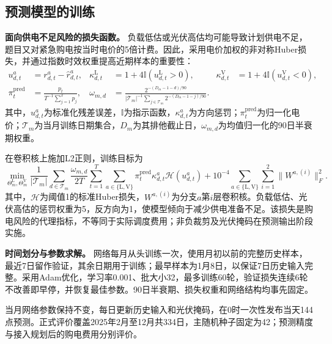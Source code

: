 \documentclass[withoutpreface,bwprint]{cumcmthesis}
\begin{document}
\subsection{预测模型的训练}
\textbf{面向供电不足风险的损失函数。}
负载低估或光伏高估均可能导致计划供电不足，题目又对紧急购电按当时电价的5倍计费。因此，采用电价加权的非对称Huber损失，并通过指数时效权重提高近期样本的重要性：
\begin{equation}\label{eq:q2-weights}
 \begin{aligned}
 u^a_{d,t}&=r^a_{d,t}-\widehat r^a_{d,t},&
 \kappa^{\mathrm L}_{d,t}&=1+4\mathbb I(u^{\mathrm L}_{d,t}>0),&
 \kappa^{\mathrm V}_{d,t}&=1+4\mathbb I(u^{\mathrm V}_{d,t}<0),\\
 \pi_t^{\mathrm{pred}}&=\frac{p_t}{T^{-1}\sum_{j=1}^{T}p_j},&
 \omega_{m,d}&=\frac{2^{-(D_m-1-d)/90}}
 {|\mathcal T_m|^{-1}\sum_{j\in\mathcal T_m}2^{-(D_m-1-j)/90}}.&&
 \end{aligned}
\end{equation}
其中，$u^a_{d,t}$为标准化残差误差，$\mathbb I$为指示函数，$\kappa^a_{d,t}$为方向惩罚；$\pi_t^{\mathrm{pred}}$为归一化电价；$\mathcal T_m$为当月训练日期集合，$D_m$为其排他截止日，$\omega_{m,d}$为均值归一化的90日半衰期权重。

在卷积核上施加L2正则，训练目标为
\begin{equation}\label{eq:q2-train-objective}
 \min_{\Theta_m^{\mathrm L},\Theta_m^{\mathrm V}}
 \frac{1}{|\mathcal T_m|}\sum_{d\in\mathcal T_m}\frac{\omega_{m,d}}{2T}
 \sum_{t=1}^{T}\sum_{a\in\{\mathrm L,\mathrm V\}}
 \pi_t^{\mathrm{pred}}\kappa^a_{d,t}\mathcal H(u^a_{d,t})
 +10^{-4}\sum_{a\in\{\mathrm L,\mathrm V\}}\sum_{i=1}^{2}\|W^{a,(i)}\|_F^2.
\end{equation}
其中，$\mathcal H$为阈值1的标准Huber损失，$W^{a,(i)}$为分支$a$第$i$层卷积核。负载低估、光伏高估的惩罚权重为5，反方向为1，使模型倾向于减少供电准备不足。该损失是购电风险的代理指标，不等同于实际调度费用；非负裁剪及光伏掩码在预测输出阶段实施。

\textbf{时间划分与参数求解。}
网络每月从头训练一次，使用月初以前的完整历史样本，最近7日留作验证，其余日期用于训练；最早样本为1月8日，以保证7日历史输入完整。采用Adam优化，学习率0.001、批大小32，最多训练60轮，验证损失连续6轮不改善即早停，并恢复最佳参数。90日半衰期、损失权重和网络结构均事先固定。

当月网络参数保持不变，每日更新历史输入和光伏掩码，在0时一次性发布当天144点预测。正式评价覆盖2025年2月至12月共334日，主随机种子固定为42；预测精度与接入规划后的购电费用分别评价。

\clearpage
\end{document}
